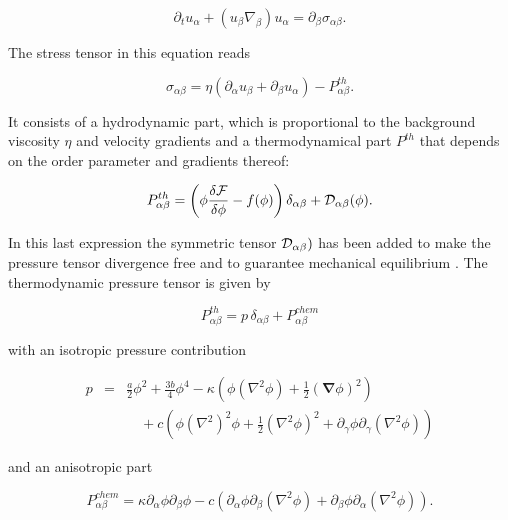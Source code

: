 \documentclass[8.5pt,twoside,twocolumn]{article}
\begin{document}
\begin{equation}\label{NSE}
\partial_t u_\alpha + (u_\beta \nabla_\beta) u_\alpha = \partial_\beta \sigma_{\alpha \beta}. 
\end{equation}

The stress tensor in this equation reads

\begin{equation}
\sigma_{\alpha \beta}=\eta (\partial_\alpha u_\beta + \partial_\beta u_\alpha)-P^{th}_{\alpha \beta}.
\end{equation}

It consists of a hydrodynamic part, which is proportional to the background viscosity $\eta$ and velocity gradients and a thermodynamical part $P^{th}$ that depends on the order parameter and gradients thereof:

\begin{equation}
P_{\alpha\beta}^{th}=\left(\phi\frac{\delta {\cal F}}{\delta \phi} -f(\phi)\right) \delta_{\alpha\beta} + {\cal D}_{\alpha \beta}(\phi).
\end{equation}  

In this last expression the symmetric tensor ${\cal D}_{\alpha\beta})$ has been added to make the pressure tensor divergence free and to guarantee mechanical equilibrium \cite{Evans79}.
The thermodynamic pressure tensor is given by

\begin{equation}
P^{th}_{\alpha \beta}=p\, \delta_{\alpha \beta} + P^{chem}_{\alpha \beta}
\end{equation}

with an isotropic pressure contribution

\begin{eqnarray}
p&=& \frac{a}{2}\phi^2+\frac{3b}{4}\phi^4-\kappa\left(\phi(\nabla^2\phi)+\frac{1}{2}({\bm \nabla}\phi)^2\right)\nonumber\\
& &\quad+c\left(\phi(\nabla^2)^2\phi+\frac{1}{2}(\nabla^2\phi)^2+\partial_{\gamma}\phi\partial_\gamma(\nabla^2\phi)\right)
\end{eqnarray}

and an anisotropic part

\begin{equation}
P^{chem}_{\alpha \beta}=\kappa\partial_\alpha\phi\partial_\beta\phi -c \left(\partial_\alpha\phi\partial_\beta(\nabla^2\phi)+\partial_\beta\phi\partial_\alpha(\nabla^2\phi)\right).
\end{equation}
\end{document}
